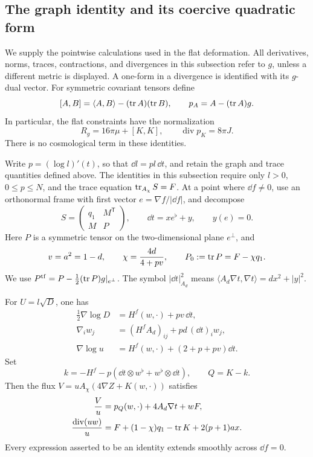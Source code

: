 \subsection{The graph identity and its coercive quadratic form}
\label{sec:fl-alg}

We supply the pointwise calculations used in the flat deformation.
All derivatives, norms, traces, contractions, and divergences in this
subsection refer to \(g\), unless a different metric is displayed.
A one-form in a divergence is identified with its \(g\)-dual vector.
For symmetric covariant tensors define
\[
 [A,B]=\langle A,B\rangle-(\operatorname{tr} A)(\operatorname{tr} B),
 \qquad p_A=A-(\operatorname{tr} A)g.
\]
In particular, the flat constraints have the normalization
\begin{equation}
 R_g=16\pi\mu+[K,K],
 \qquad \operatorname{div}p_K=8\pi J.
 \label{eq:fl-alg-constraints}
\end{equation}
There is no cosmological term in these identities.

Write \(p=(\log l)'(t)\), so that \(\dd l=pl\,\dd t\), and retain the
graph and trace quantities defined above.
The identities in this subsection require only \(l>0\), \(0\le p\le N\),
and the trace equation \(\operatorname{tr}_{A_\chi}S=F\).
At a point where \(\dd f\ne0\), use an orthonormal frame with first
vector \(e=\nabla f/|\dd f|\), and decompose
\[
 S=\begin{pmatrix}q_1&M^{\mathsf T}\\M&P\end{pmatrix},
 \qquad \dd t=x e^\flat+y,\qquad y(e)=0.
\]
Here \(P\) is a symmetric tensor on the two-dimensional plane
\(e^\perp\), and
\begin{equation}
 v=a^2=1-d,\qquad
 \chi=\frac{4d}{4+pv},\qquad
 P_0:=\operatorname{tr} P=F-\chi q_1.
 \label{eq:fl-alg-blocks}
\end{equation}
We use \(P^{\mathrm{tf}}=P-\frac12(\operatorname{tr} P)g|_{e^\perp}\).
The symbol \(|\dd t|_{A_d}^2\) means
\(\langle A_d\nabla t,\nabla t\rangle=dx^2+|y|^2\).

\begin{lemma}
\label{lem:fl-alg-flux}
For \(U=l\sqrt D\), one has
\begin{align}
 \tfrac12\nabla\log D
   &=H^f(w,\cdot)+pv\,\dd t,
   \label{eq:fl-alg-D-derivative}\\
 \nabla_iw_j
   &=(H^f A_d)_{ij}+pd\,(\dd t)_i w_j,
   \label{eq:fl-alg-w-derivative}\\
 \nabla\log u
   &=H^f(w,\cdot)+(2+p+pv)\dd t.
   \label{eq:fl-alg-u-derivative}
\end{align}
Set
\[
 k=-H^f-p(\dd t\otimes w^\flat+w^\flat\otimes\dd t),
 \qquad Q=K-k.
\]
Then the flux \(V=uA_\chi(4\nabla Z+K(w,\cdot))\) satisfies
\begin{align}
 \frac{V}{u}
    &=p_Q(w,\cdot)+4A_d\nabla t+wF,
    \label{eq:fl-alg-flux-identity}\\
 \frac{\operatorname{div}(uw)}u
    &=F+(1-\chi)q_1-\operatorname{tr} K+2(p+1)ax.
    \label{eq:fl-alg-uw-divergence}
\end{align}
Every expression asserted to be an identity extends smoothly across
\(\dd f=0\).
\end{lemma}

